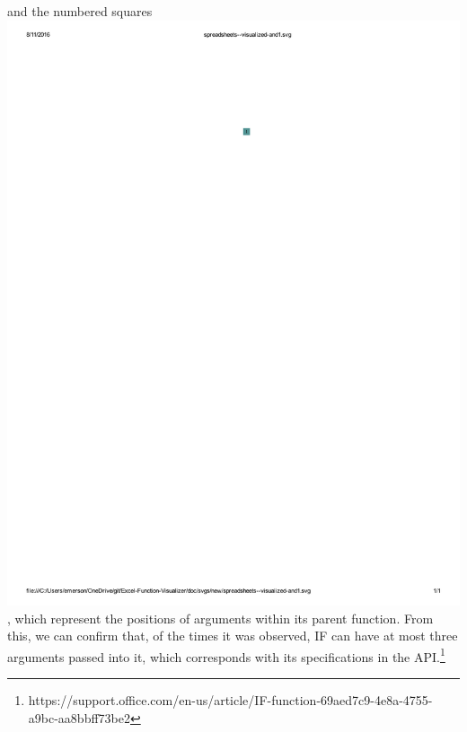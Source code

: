\documentclass[conference]{IEEEtran}
\begin{document}
	and the numbered squares \includegraphics{glossary-blue}, which represent the positions of arguments within its
	parent function. From this, we can confirm that, of the times it was observed, IF
	can have at most three arguments passed into it, which corresponds with its
	specifications in the
	API.\footnote{https://support.office.com/en-us/article/IF-function-69aed7c9-4e8a-4755-a9bc-aa8bbff73be2} \par
	
\end{document}
